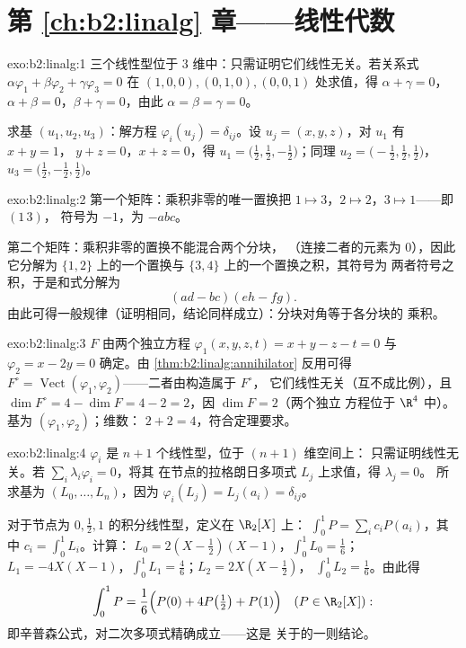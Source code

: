 \section*{第 \ref{ch:b2:linalg} 章——线性代数}

\begin{solution}{exo:b2:linalg:1}
三个线性型位于 $3$ 维中：只需证明它们线性无关。若关系式
$\alpha\varphi_1 + \beta\varphi_2 + \gamma\varphi_3 = 0$ 在
$(1,0,0), (0,1,0), (0,0,1)$ 处求值，得 $\alpha + \gamma = 0$，$\alpha +
\beta = 0$，$\beta + \gamma = 0$，由此 $\alpha = \beta = \gamma =
0$。

求基 $(u_1, u_2, u_3)$：解方程 $\varphi_i(u_j) =
\delta_{ij}$。设 $u_j = (x, y, z)$，对 $u_1$ 有 $x + y = 1$，
$y + z = 0$，$x + z = 0$，得 $u_1 = \bigl(\tfrac12, \tfrac12,
-\tfrac12\bigr)$；同理 $u_2 = \bigl(-\tfrac12, \tfrac12,
\tfrac12\bigr)$，$u_3 = \bigl(\tfrac12, -\tfrac12, \tfrac12\bigr)$。
\end{solution}

\begin{solution}{exo:b2:linalg:2}
第一个矩阵：乘积非零的唯一置换把 $1 \mapsto
3$，$2 \mapsto 2$，$3 \mapsto 1$——即 $(1\,3)$，
符号为 $-1$，为 $-abc$。

第二个矩阵：乘积非零的置换不能混合两个分块，
（连接二者的元素为 $0$），因此它分解为
$\{1,2\}$ 上的一个置换与 $\{3,4\}$ 上的一个置换之积，其符号为
两者符号之积，于是和式分解为
\[
(ad - bc)(eh - fg) .
\]
由此可得一般规律（证明相同，结论同样成立）：分块对角等于各分块的
乘积。
\end{solution}

\begin{solution}{exo:b2:linalg:3}
$F$ 由两个独立方程 $\varphi_1(x,y,z,t)
= x + y - z - t = 0$ 与 $\varphi_2 = x - 2y = 0$ 确定。由
\cref{thm:b2:linalg:annihilator} 反用可得 $F^\circ =
\operatorname{Vect}(\varphi_1, \varphi_2)$——二者由构造属于 $F^\circ$，
它们线性无关（互不成比例），且 $\dim F^\circ
= 4 - \dim F = 4 - 2 = 2$，因 $\dim F = 2$（两个独立
方程位于 $\R^4$ 中）。基为 $(\varphi_1, \varphi_2)$；维数：
$2 + 2 = 4$，符合定理要求。
\end{solution}

\begin{solution}{exo:b2:linalg:4}
$\varphi_i$ 是 $n + 1$ 个线性型，位于 $(n+1)$ 维空间上：
只需证明线性无关。若 $\sum_i \lambda_i \varphi_i = 0$，将其
在节点的拉格朗日多项式 $L_j$ 上求值，得 $\lambda_j = 0$。
所求基为 $(L_0, \dots, L_n)$，因为 $\varphi_i(L_j) =
L_j(a_i) = \delta_{ij}$。

对于节点为 $0, \frac12, 1$ 的积分线性型，定义在 $\R_2[X]$ 上：
$\int_0^1 P = \sum_i c_i P(a_i)$，其中 $c_i = \int_0^1 L_i$。计算：
$L_0 = 2(X - \tfrac12)(X - 1)$，$\int_0^1 L_0 = \frac16$；$L_1 =
-4X(X-1)$，$\int_0^1 L_1 = \frac46$；$L_2 = 2X(X - \tfrac12)$，
$\int_0^1 L_2 = \frac16$。由此得
\[
\int_0^1 P = \frac{1}{6}\Bigl(P(0) + 4P\bigl(\tfrac12\bigr) +
P(1)\Bigr)
\quad (P \in \R_2[X]) :
\]
即辛普森公式，对二次多项式精确成立——这是
关于的一则结论。
\end{solution}

